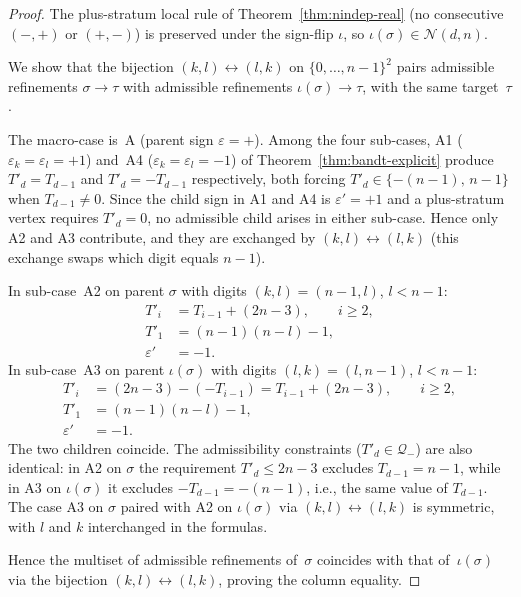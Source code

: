 \documentclass{amsart}
\theoremstyle{definition}
\theoremstyle{remark}
\begin{document}
\begin{proof}
The plus-stratum local rule of Theorem~\ref{thm:nindep-real} (no
consecutive $(-, +)$ or $(+, -)$) is preserved under the
sign-flip $\iota$, so $\iota(\sigma) \in \mathcal{N}(d, n)$.

We show that the bijection $(k, l) \leftrightarrow (l, k)$ on
$\{0, \ldots, n-1\}^2$ pairs admissible refinements
$\sigma \to \tau$ with admissible refinements
$\iota(\sigma) \to \tau$, with the same target~$\tau$.

The macro-case is~A (parent sign $\varepsilon = +$).  Among the
four sub-cases, A1 ($\varepsilon_k = \varepsilon_l = +1$) and~A4
($\varepsilon_k = \varepsilon_l = -1$) of
Theorem~\ref{thm:bandt-explicit} produce $T'_d = T_{d-1}$ and
$T'_d = -T_{d-1}$ respectively, both forcing $T'_d \in
\{-(n-1),\, n-1\}$ when $T_{d-1} \neq 0$.  Since the child sign
in A1 and A4 is $\varepsilon' = +1$ and a plus-stratum vertex
requires $T'_d = 0$, no admissible child arises in either
sub-case.  Hence only A2 and A3 contribute, and they are
exchanged by $(k, l) \leftrightarrow (l, k)$ (this exchange
swaps which digit equals $n-1$).

In sub-case~A2 on parent $\sigma$ with digits $(k, l) = (n-1, l)$,
$l < n-1$:
\begin{align*}
  T'_i &= T_{i-1} + (2n-3), \qquad i \ge 2,\\
  T'_1 &= (n-1)(n - l) - 1,\\
  \varepsilon' &= -1.
\end{align*}
In sub-case~A3 on parent $\iota(\sigma)$ with digits
$(l, k) = (l, n-1)$, $l < n-1$:
\begin{align*}
  T'_i &= (2n-3) - (-T_{i-1}) = T_{i-1} + (2n-3), \qquad i \ge 2,\\
  T'_1 &= (n-1)(n - l) - 1,\\
  \varepsilon' &= -1.
\end{align*}
The two children coincide.  The admissibility constraints
($T'_d \in \mathcal{Q}_-$) are also identical: in A2 on $\sigma$
the requirement $T'_d \le 2n-3$ excludes $T_{d-1} = n-1$, while
in A3 on $\iota(\sigma)$ it excludes $-T_{d-1} = -(n-1)$, i.e.,
the same value of $T_{d-1}$.  The case A3 on $\sigma$ paired
with A2 on $\iota(\sigma)$ via $(k, l) \leftrightarrow (l, k)$
is symmetric, with $l$ and $k$ interchanged in the formulas.

Hence the multiset of admissible refinements of~$\sigma$
coincides with that of~$\iota(\sigma)$ via the bijection
$(k, l) \leftrightarrow (l, k)$, proving the column equality.
\end{proof}
\end{document}
